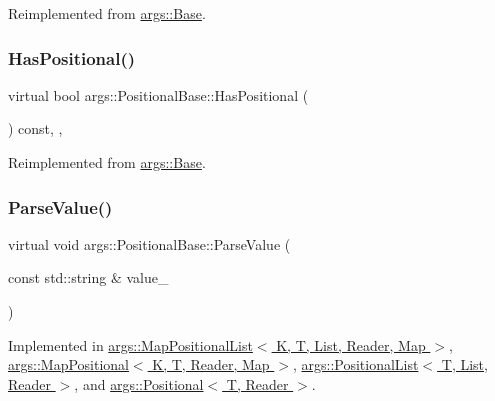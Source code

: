 Reimplemented from \hyperlink{classargs_1_1_base_a88fcbbc4bfe3b7af9fafe6e96a19f337}{args\+::\+Base}.

\mbox{\label{classargs_1_1_positional_base_ad730bb355966fa423046bef31015fbc3}} 
\subsubsection{\texorpdfstring{Has\+Positional()}{HasPositional()}}
{\footnotesize\ttfamily virtual bool args\+::\+Positional\+Base\+::\+Has\+Positional (\begin{DoxyParamCaption}{ }\end{DoxyParamCaption}) const\hspace{0.3cm}{\ttfamily [inline]}, {\ttfamily [override]}, {\ttfamily [virtual]}}



Reimplemented from \hyperlink{classargs_1_1_base_a3825f4afe867335438103a0d45ced9f7}{args\+::\+Base}.

\mbox{\label{classargs_1_1_positional_base_a10b6b91155f56bc28ca25fa87c6f0985}} 
\subsubsection{\texorpdfstring{Parse\+Value()}{ParseValue()}}
{\footnotesize\ttfamily virtual void args\+::\+Positional\+Base\+::\+Parse\+Value (\begin{DoxyParamCaption}\item[{const std\+::string \&}]{value\+\_\+ }\end{DoxyParamCaption})\hspace{0.3cm}{\ttfamily [pure virtual]}}



Implemented in \hyperlink{classargs_1_1_map_positional_list_ac2d042c42bc771954f340dc0a3b582c7}{args\+::\+Map\+Positional\+List$<$ K, T, List, Reader, Map $>$}, \hyperlink{classargs_1_1_map_positional_a8ac67b0ee5008bd6c9a39974c2a40ee4}{args\+::\+Map\+Positional$<$ K, T, Reader, Map $>$}, \hyperlink{classargs_1_1_positional_list_a532d58c777cabe560dfa02674c591245}{args\+::\+Positional\+List$<$ T, List, Reader $>$}, and \hyperlink{classargs_1_1_positional_a2ae24a17caca2e02b95f0977783fc65d}{args\+::\+Positional$<$ T, Reader $>$}.

